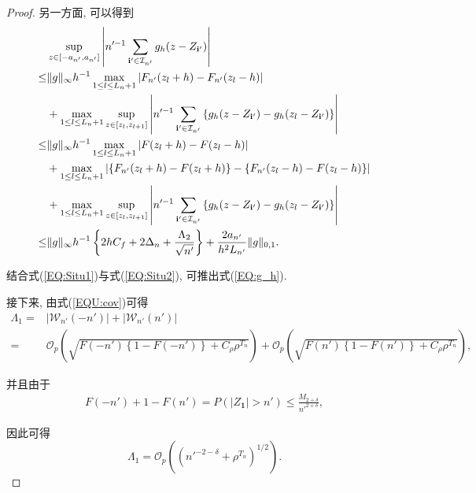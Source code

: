 \documentclass[a4paper,openay,14pt]{ctexbook}
\numberwithin{equation}{section}
\numberwithin{lem}{section}
\begin{document}
\begin{proof}
另一方面, 可以得到
\begin{align}
    &\sup_{z\in\left[-a_{n'},a_{n'}\right]}
    \left\vert n'^{-1}\sum_{\mathbf{i}'\in\mathcal{I}_{n'}}g_h(z-Z_{\mathbf{i}'})\right\vert \notag\\
    \leq &
    \Vert g\Vert_{\infty}h^{-1}
    \max_{1\leq l\leq L_n+1}
    \left\vert F_{n'}(z_l+h) - F_{n'}(z_l-h)\right\vert \notag\\
    &+
    \max_{1\leq l\leq L_n+1}
    \sup_{z\in\left[z_l,z_{l+1}\right]}
    \left\vert n'^{-1}\sum_{\mathbf{i}'\in\mathcal{I}_{n'}}
    \left\{g_h(z-Z_{\mathbf{i}'}) - g_h(z_l-Z_{\mathbf{i}'})\right\}\right\vert \notag\\
    \leq &
    \Vert g\Vert_{\infty}h^{-1}
    \max_{1\leq l\leq L_n+1}
    \left\vert F(z_l+h) - F(z_l-h)\right\vert \notag\\
    &+
    \max_{1\leq l\leq L_n+1}
    \left\vert
    \left\{ F_{n'}(z_l+h) - F(z_l+h)\right \}
    -\left \{F_{n'}(z_l-h) - F(z_l-h)\right \}
    \right\vert \notag\\
    &+
    \max_{1\leq l\leq L_n+1}
    \sup_{z\in\left[z_l,z_{l+1}\right]}
    \left\vert n'^{-1}\sum_{\mathbf{i}'\in\mathcal{I}_{n'}}
    \left\{g_h(z-Z_{\mathbf{i}'}) - g_h(z_l-Z_{\mathbf{i}'})\right\}\right\vert \notag\\
    \leq &
    \Vert g\Vert_{\infty}h^{-1}
    \left\{2hC_f + 2\Delta_n + \frac{\Lambda_2}{\sqrt{n'}}\right\}
    + \frac{2a_{n'}}{h^2L_{n'}}\Vert g\Vert_{0,1}.
\label{EQ:Situ2}
\end{align}

结合式(\ref{EQ:Situ1})与式(\ref{EQ:Situ2}), 可推出式(\ref{EQ:g_h}).

接下来, 由式(\ref{EQU:cov})可得
\begin{align*}
    \Lambda_1
    = &\left\vert \mathcal{W}_{n'}(-n')\right\vert
      + \left\vert \mathcal{W}_{n'}(n')\right\vert\\
    = &
    \mathcal{O}_p\left(
    \sqrt{F(-n')\left\{1-F(-n') \right\}+C_{\rho}\rho^{T_n}}
    \right)
    +
    \mathcal{O}_p\left(
    \sqrt{F(n')\left\{1-F(n')\right\} +C_{\rho}\rho^{T_n}}
    \right),
\end{align*}

并且由于
\begin{align*}
    F(-n')+1-F(n')
    = P\left(\vert Z_{\mathbf{1}} \vert> n'\right)
    \leq \frac{M_{2+\delta}}{n'^{2+\delta}},
\end{align*}

因此可得
\[
\Lambda_1
=
\mathcal{O}_{p}\left(\left(n'^{-2-\delta}+\rho^{T_n}\right)^{1/2}\right).
\]


\end{proof}
\end{document}
